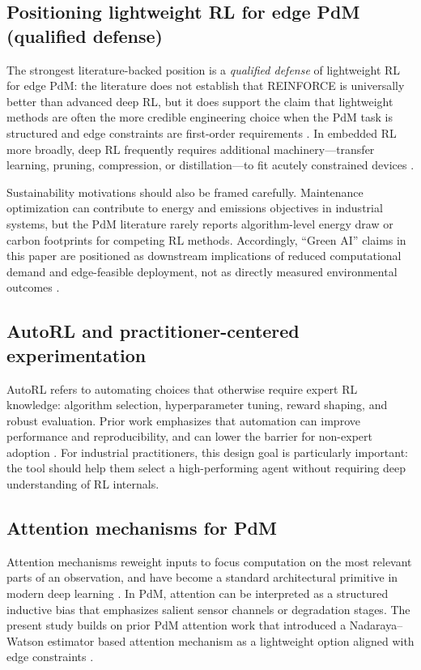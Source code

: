 \documentclass[refree,sn-basic]{sn-jnl} %
\begin{document}
\subsection{Positioning lightweight RL for edge PdM (qualified defense)}
The strongest literature-backed position is a \emph{qualified defense} of lightweight RL for edge PdM: the literature does not establish that REINFORCE is universally better than advanced deep RL, but it does support the claim that lightweight methods are often the more credible engineering choice when the PdM task is structured and edge constraints are first-order requirements \cite{Compare2020IoT, Njor2024TinyML, Pandey2023EdgeDNN}. In embedded RL more broadly, deep RL frequently requires additional machinery---transfer learning, pruning, compression, or distillation---to fit acutely constrained devices \cite{Jang2020KnowledgeTransfer, Szydlo2022TinyRL, Xu2022ISORC}.

Sustainability motivations should also be framed carefully. Maintenance optimization can contribute to energy and emissions objectives in industrial systems, but the PdM literature rarely reports algorithm-level energy draw or carbon footprints for competing RL methods. Accordingly, ``Green AI'' claims in this paper are positioned as downstream implications of reduced computational demand and edge-feasible deployment, not as directly measured environmental outcomes \cite{Banyai2021Energies, Banyai2022Sustainability, JasiulewiczKaczmarek2024Maintenance40}.

\subsection{AutoRL and practitioner-centered experimentation}
AutoRL refers to automating choices that otherwise require expert RL knowledge: algorithm selection, hyperparameter tuning, reward shaping, and robust evaluation. Prior work emphasizes that automation can improve performance and reproducibility, and can lower the barrier for non-expert adoption \cite{Faust2019EvolvingRewards, Mussi2023ARLO}. For industrial practitioners, this design goal is particularly important: the tool should help them select a high-performing agent without requiring deep understanding of RL internals.

\subsection{Attention mechanisms for PdM}
Attention mechanisms reweight inputs to focus computation on the most relevant parts of an observation, and have become a standard architectural primitive in modern deep learning \cite{Vaswani2017Attention}. In PdM, attention can be interpreted as a structured inductive bias that emphasizes salient sensor channels or degradation stages. The present study builds on prior PdM attention work that introduced a Nadaraya--Watson estimator based attention mechanism as a lightweight option aligned with edge constraints \cite{Siraskar2024NWAttention}.
\end{document}
